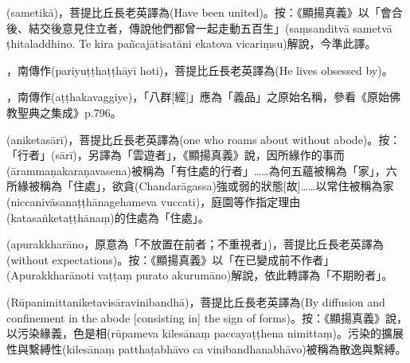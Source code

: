 \startitemgroup[noteitems]
\item{}(sametikā)，菩提比丘長老英譯為(Have been united)。按：《顯揚真義》以「會合後、結交後意見住立者，傳說他們都曾一起走動五百生」(saṃsanditvā sametvā ṭhitaladdhino. Te kira pañcajātisatāni ekatova vicariṃsu)解說，今準此譯。
\stopitemgroup

\startitemgroup[noteitems]
\item{}，南傳作(pariyuṭṭhaṭṭhāyī hoti)，菩提比丘長老英譯為(He lives obsessed by)。
\stopitemgroup

\startitemgroup[noteitems]
\item{}，南傳作(aṭṭhakavaggiye)，「八群[經]」應為「義品」之原始名稱，參看《原始佛教聖典之集成》p.796。
\stopitemgroup

\startitemgroup[noteitems]
\item{}(aniketasārī)，菩提比丘長老英譯為(one who roams about without abode)。按：「行者」(sārī)，另譯為「雲遊者」，《顯揚真義》說，因所緣作的事而(ārammaṇakaraṇavasena)被稱為「有住處的行者」……為何五蘊被稱為「家」，六所緣被稱為「住處」，欲貪(Chandarāgassa)強或弱的狀態[故]……以常住被稱為家(niccanivāsanaṭṭhānagehameva vuccati)，庭園等作指定理由(katasaṅketaṭṭhānaṃ)的住處為「住處」。
\stopitemgroup

\startitemgroup[noteitems]
\item{}(apurakkharāno，原意為「不放置在前者；不重視者」)，菩提比丘長老英譯為(without expectations)。按：《顯揚真義》以「在已變成前不作者」(Apurakkharānoti vaṭṭaṃ purato akurumāno)解說，依此轉譯為「不期盼者」。
\stopitemgroup

\startitemgroup[noteitems]
\item{}(Rūpanimittaniketavisāravinibandhā)，菩提比丘長老英譯為(By diffusion and confinement in the abode [consisting in] the sign of forms)。按：《顯揚真義》說，以污染緣義，色是相(rūpameva kilesānaṃ paccayaṭṭhena nimittaṃ)。污染的擴展性與繫縛性(kilesānaṃ patthaṭabhāvo ca vinibandhanabhāvo)被稱為散逸與繫縛。
\stopitemgroup

